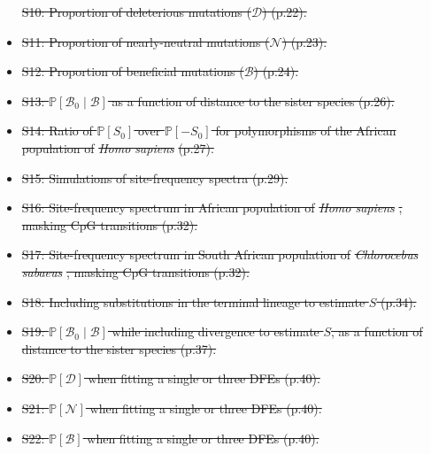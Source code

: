 \documentclass[10pt,letterpaper]{article}
\newcommand{\proba}{\mathbb{P}}
\newcommand{\Sphy}{S_{0}}
\newcommand{\SphyBen}{\mathcal{B}_0}
\newcommand{\given}{\mid}
\newcommand{\Spop}{S}
\newcommand{\SpopDel}{\mathcal{D}}
\newcommand{\SpopNeu}{\mathcal{N}}
\newcommand{\SpopBen}{\mathcal{B}}
\providecommand{\DIFdeltex}[1]{{\protect\color{red}\sout{#1}}}                      %
\providecommand{\DIFdel}[1]{\texorpdfstring{\DIFdeltex{#1}}{}} %
\begin{document}
\begin{itemize}
\DIFdel{S10: Proportion of deleterious mutations ($\SpopDel$) (p.22).
}%
\item%
\DIFdel{S11: Proportion of nearly-neutral mutations ($\SpopNeu$) (p.23).
}%
\item%
\DIFdel{S12: Proportion of beneficial mutations ($\SpopBen$) (p.24).
}%
\item%
\DIFdel{S13: $\proba[\SphyBen\given \SpopBen ]$ as a function of distance to the sister species (p.26).
}%
\item%
\DIFdel{S14: Ratio of $\proba[\Sphy]$ over $\proba[-\Sphy]$ for polymorphisms of the African population of }\textit{\DIFdel{Homo sapiens}} %
\DIFdel{(p.27).
}%
\item%
\DIFdel{S15: Simulations of site-frequency spectra (p.29).
}%
\item%
\DIFdel{S16: Site-frequency spectrum in African population of }\textit{\DIFdel{Homo sapiens}}%
\DIFdel{, masking CpG transitions  (p.32).
}%
\item%
\DIFdel{S17: Site-frequency spectrum in South African population of }\textit{\DIFdel{Chlorocebus sabaeus}}%
\DIFdel{, masking CpG transitions (p.32).
}%
\item%
\DIFdel{S18: Including substitutions in the terminal lineage to estimate $\Spop$ (p.34).
}%
\item%
\DIFdel{S19: $\proba[\SphyBen\given \SpopBen ]$ while including divergence to estimate $\Spop$, as a function of distance to the sister species (p.37).
}%
\item%
\DIFdel{S20: $\proba [ \SpopDel ]$ when fitting a single or three DFEs (p.40).
}%
\item%
\DIFdel{S21: $\proba [ \SpopNeu ]$ when fitting a single or three DFEs (p.40).
}%
\item%
\DIFdel{S22: $\proba [ \SpopBen ]$ when fitting a single or three DFEs (p.40).
}
\end{itemize}%
\end{document}
